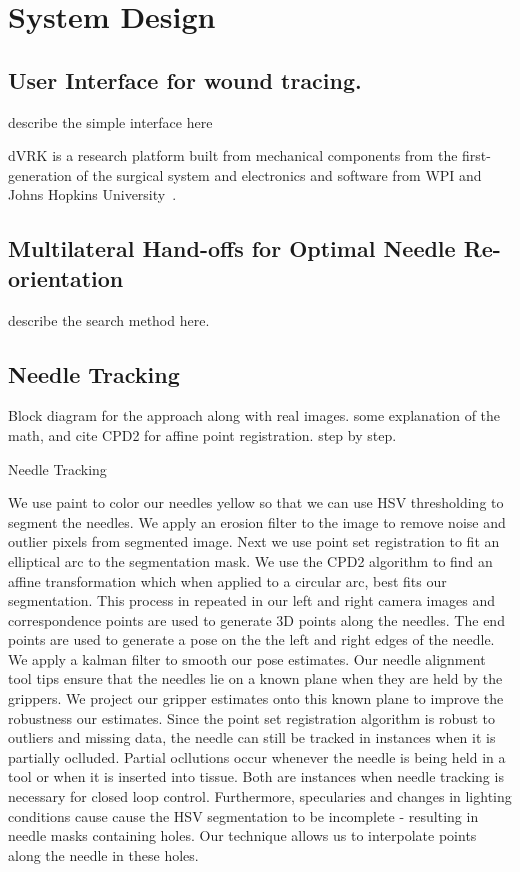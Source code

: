 \section{System Design}
\label{sec:system}
\subsection{User Interface for wound tracing.}
describe the simple interface here

 dVRK is a research platform built from mechanical components from the first-generation of the \davinci surgical system \cite{Ballantyne2003} and electronics and software from WPI and Johns Hopkins University~\cite{Kazanzides2014}.

\subsection{Multilateral Hand-offs for Optimal Needle Re-orientation}
describe the search method here.  


\subsection{Needle Tracking}
Block diagram for the approach along with real images. 
some explanation of the math, and cite CPD2 for affine point registration. 
step by step.

Needle Tracking

    We use paint to color our needles yellow so that we can use HSV thresholding to
segment the needles. We apply an erosion filter to the image to remove noise and
outlier pixels from segmented image. Next we use point set registration to fit an
elliptical arc to the segmentation mask. We use the CPD2 algorithm to find
an affine transformation which when applied to a circular arc, best fits our
segmentation. This process in repeated in our left and right camera images and
correspondence points are used to generate 3D points along the needles.
The end points are used to generate a pose on the the left and right edges of
the needle. We apply a kalman filter to smooth our pose estimates.
Our needle alignment tool tips ensure that the needles lie on a known plane when
they are held by the grippers. We project our gripper estimates onto this known
plane to improve the robustness our estimates.
    Since the point set registration algorithm is robust to outliers and missing
data, the needle can still be tracked in instances when it is partially oclluded.
Partial ocllutions occur whenever the needle is being held in a tool or when it
is inserted into tissue. Both are instances when needle tracking is necessary
for closed loop control. Furthermore, specularies and changes in lighting conditions
cause cause the HSV segmentation to be incomplete - resulting in needle masks
containing holes. Our technique allows us to interpolate points along the needle
in these holes.




